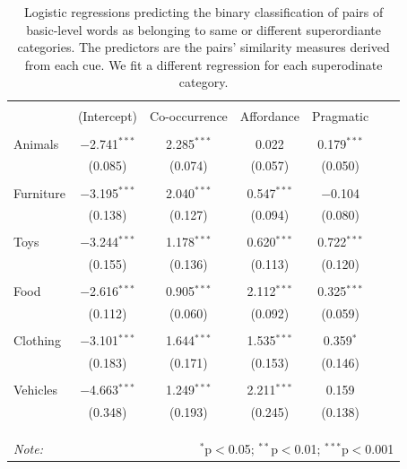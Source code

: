 \documentclass[english,,man,floatsintext]{apa6}
\begin{document}
\begin{table}[!htbp] \centering 
\caption{\label{tab:regressions} Logistic regressions predicting the binary classification of pairs of basic-level words as belonging to same or different superordiante categories. The predictors are the pairs' similarity measures derived from each cue. We fit a different regression for each superodinate category.} 
\label{} 
\begin{tabular}{@{\extracolsep{5pt}}lcccccc} 
\hline 
 & \multicolumn{4}{c}{} \\
 & (Intercept) & Co-occurrence & Affordance & Pragmatic \\ 
\hline \\[-1.8ex] 
  Animals & $-$2.741$^{***}$ & 2.285$^{***}$ & 0.022 & 0.179$^{***}$\\
  & (0.085) & (0.074) & (0.057) & (0.050)\\
  & & & & & & \\
  Furniture & $-$3.195$^{***}$ & 2.040$^{***}$ & 0.547$^{***}$ & $-$0.104\\
  & (0.138) & (0.127) & (0.094) & (0.080) &\\
  & & & & & & \\
  Toys & $-$3.244$^{***}$ & 1.178$^{***}$ &  0.620$^{***}$ & 0.722$^{***}$\\
  & (0.155) & (0.136) & (0.113) & (0.120) &\\
  & & & & & & \\
  Food & $-$2.616$^{***}$ & 0.905$^{***}$ & 2.112$^{***}$ & 0.325$^{***}$\\
  & (0.112) & (0.060) & (0.092) & (0.059)\\
  & & & & & & \\
  Clothing & $-$3.101$^{***}$ & 1.644$^{***}$ & 1.535$^{***}$ & 0.359$^{*}$\\
  & (0.183) & (0.171) & (0.153) & (0.146)\\
  & & & & & & \\
  Vehicles & $-$4.663$^{***}$ & 1.249$^{***}$ & 2.211$^{***}$ & 0.159\\
  & (0.348) & (0.193) & (0.245) & (0.138)\\
  & & & & & & \\
 \\[-1.8ex] 

\hline \\[-1.8ex] 
\textit{Note:}  & \multicolumn{6}{r}{$^{*}$p$<$0.05; $^{**}$p$<$0.01; $^{***}$p$<$0.001} \\ 
\end{tabular} 
\end{table}
\end{document}
